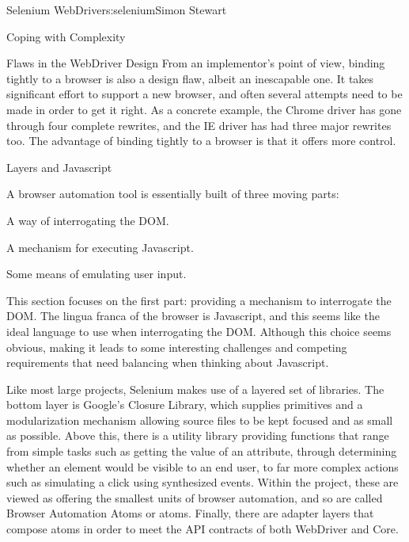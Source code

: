 \begin{aosachapter}{Selenium WebDriver}{s:selenium}{Simon Stewart}
\begin{aosasect1}{Coping with Complexity}
\begin{aosasect2}{Flaws in the WebDriver Design}
From an implementor's point of view, binding tightly to a browser is
also a design flaw, albeit an inescapable one. It takes significant
effort to support a new browser, and often several attempts need to be
made in order to get it right. As a concrete example, the Chrome
driver has gone through four complete rewrites, and the IE driver has
had three major rewrites too. The advantage of binding tightly to a
browser is that it offers more control.

\end{aosasect2}

\end{aosasect1}

\begin{aosasect1}{Layers and Javascript}
\label{sec.selenium.layers}

A browser automation tool is essentially built of three moving parts:

\begin{aosaitemize}

\item A way of interrogating the DOM.

\item A mechanism for executing Javascript.

\item Some means of emulating user input.

\end{aosaitemize}

This section focuses on the first part: providing a mechanism to
interrogate the DOM\@. The lingua franca of the browser is Javascript,
and this seems like the ideal language to use when interrogating the
DOM\@. Although this choice seems obvious, making it leads to some
interesting challenges and competing requirements that need balancing
when thinking about Javascript.

Like most large projects, Selenium makes use of a layered set of
libraries.  The bottom layer is Google's Closure Library, which
supplies primitives and a modularization mechanism allowing source
files to be kept focused and as small as possible. Above this, there
is a utility library providing functions that range from simple tasks
such as getting the value of an attribute, through determining whether
an element would be visible to an end user, to far more complex
actions such as simulating a click using synthesized events. Within
the project, these are viewed as offering the smallest units of
browser automation, and so are called Browser Automation Atoms or
atoms. Finally, there are adapter layers that compose atoms in order
to meet the API contracts of both WebDriver and Core.


\end{aosasect1}
\end{aosachapter}
